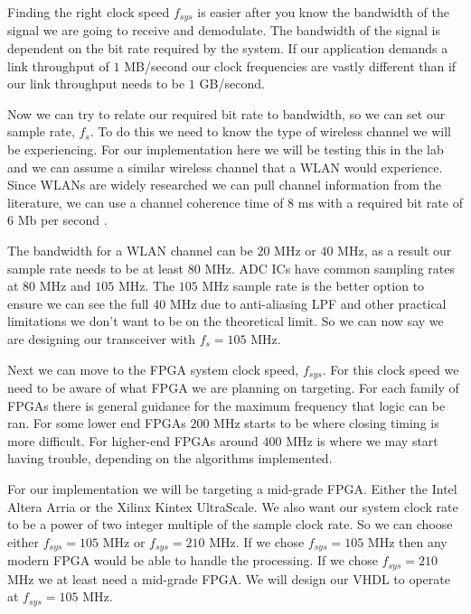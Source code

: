 Finding the right clock speed $f_{sys}$ is easier after you know the bandwidth of the signal we are going to receive and demodulate. The bandwidth of the signal is dependent on the bit rate required by the system. If our application demands a link throughput of $1$ \ac{MB}/second our clock frequencies are vastly different than if our link throughput needs to be $1$ \ac{GB}/second.

Now we can try to relate our required bit rate to bandwidth, so we can set our sample rate, $f_s$. To do this we need to know the type of wireless channel we will be experiencing. For our implementation here we will be testing this in the lab and we can assume a similar wireless channel that a \ac{WLAN} would experience. Since \ac{WLAN}s are widely researched we can pull channel information from the literature, we can use a channel coherence time of $8$ \ac{ms} with a required bit rate of $6$ \ac{Mb} per second \cite{jung2011react}.


The bandwidth for a \ac{WLAN} channel can be $20$ \ac{MHz} or $40$ \ac{MHz}, as a result our sample rate needs to be at least $80$ \ac{MHz}. \ac{ADC} \ac{IC}s have common sampling rates at $80$ \ac{MHz} and $105$ \ac{MHz}. The $105$ \ac{MHz} sample rate is the better option to ensure we can see the full $40$ \ac{MHz} due to anti-aliasing \ac{LPF} and other practical limitations we don't want to be on the theoretical limit. So we can now say we are designing our transceiver with $f_s = 105$ \ac{MHz}.

Next we can move to the \ac{FPGA} system clock speed, $f_{sys}$. For this clock speed we need to be aware of what \ac{FPGA} we are planning on targeting. For each family of \ac{FPGA}s there is general guidance for the maximum frequency that logic can be ran. For some lower end \ac{FPGA}s $200$ \ac{MHz} starts to be where closing timing is more difficult. For higher-end \ac{FPGA}s around $400$ \ac{MHz} is where we may start having trouble, depending on the algorithms implemented.

For our implementation we will be targeting a mid-grade \ac{FPGA}. Either the Intel Altera Arria or the Xilinx Kintex UltraScale. We also want our system clock rate to be a power of two integer multiple of the sample clock rate. So we can choose either $f_{sys} = 105$ \ac{MHz} or $f_{sys} = 210$ \ac{MHz}. If we chose $f_{sys} = 105$ \ac{MHz} then any modern \ac{FPGA} would be able to handle the processing. If we chose $f_{sys} = 210$ \ac{MHz} we at least need a mid-grade \ac{FPGA}. We will design our \ac{VHDL} to operate at $f_{sys} = 105$ \ac{MHz}.


